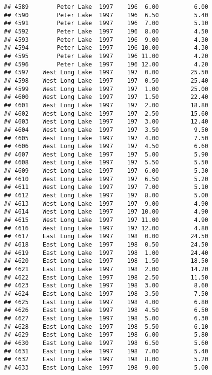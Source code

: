\documentclass[
]{article}
\begin{document}
\begin{verbatim}
## 4589        Peter Lake  1997    196  6.00          6.00
## 4590        Peter Lake  1997    196  6.50          5.40
## 4591        Peter Lake  1997    196  7.00          5.10
## 4592        Peter Lake  1997    196  8.00          4.50
## 4593        Peter Lake  1997    196  9.00          4.30
## 4594        Peter Lake  1997    196 10.00          4.30
## 4595        Peter Lake  1997    196 11.00          4.20
## 4596        Peter Lake  1997    196 12.00          4.20
## 4597    West Long Lake  1997    197  0.00         25.50
## 4598    West Long Lake  1997    197  0.50         25.40
## 4599    West Long Lake  1997    197  1.00         25.00
## 4600    West Long Lake  1997    197  1.50         22.40
## 4601    West Long Lake  1997    197  2.00         18.80
## 4602    West Long Lake  1997    197  2.50         15.60
## 4603    West Long Lake  1997    197  3.00         12.40
## 4604    West Long Lake  1997    197  3.50          9.50
## 4605    West Long Lake  1997    197  4.00          7.50
## 4606    West Long Lake  1997    197  4.50          6.60
## 4607    West Long Lake  1997    197  5.00          5.90
## 4608    West Long Lake  1997    197  5.50          5.50
## 4609    West Long Lake  1997    197  6.00          5.30
## 4610    West Long Lake  1997    197  6.50          5.20
## 4611    West Long Lake  1997    197  7.00          5.10
## 4612    West Long Lake  1997    197  8.00          5.00
## 4613    West Long Lake  1997    197  9.00          4.90
## 4614    West Long Lake  1997    197 10.00          4.90
## 4615    West Long Lake  1997    197 11.00          4.90
## 4616    West Long Lake  1997    197 12.00          4.80
## 4617    East Long Lake  1997    198  0.00         24.50
## 4618    East Long Lake  1997    198  0.50         24.50
## 4619    East Long Lake  1997    198  1.00         24.40
## 4620    East Long Lake  1997    198  1.50         18.50
## 4621    East Long Lake  1997    198  2.00         14.20
## 4622    East Long Lake  1997    198  2.50         11.50
## 4623    East Long Lake  1997    198  3.00          8.60
## 4624    East Long Lake  1997    198  3.50          7.50
## 4625    East Long Lake  1997    198  4.00          6.80
## 4626    East Long Lake  1997    198  4.50          6.50
## 4627    East Long Lake  1997    198  5.00          6.30
## 4628    East Long Lake  1997    198  5.50          6.10
## 4629    East Long Lake  1997    198  6.00          5.80
## 4630    East Long Lake  1997    198  6.50          5.60
## 4631    East Long Lake  1997    198  7.00          5.40
## 4632    East Long Lake  1997    198  8.00          5.20
## 4633    East Long Lake  1997    198  9.00          5.00

\end{verbatim}
\end{document}
